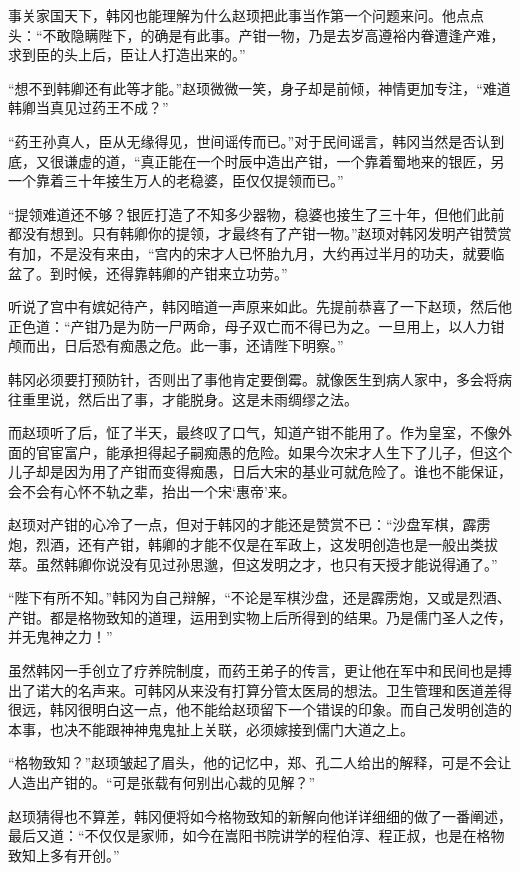 事关家国天下，韩冈也能理解为什么赵顼把此事当作第一个问题来问。他点点头：“不敢隐瞒陛下，的确是有此事。产钳一物，乃是去岁高遵裕内眷遭逢产难，求到臣的头上后，臣让人打造出来的。”

“想不到韩卿还有此等才能。”赵顼微微一笑，身子却是前倾，神情更加专注，“难道韩卿当真见过药王不成？”

“药王孙真人，臣从无缘得见，世间谣传而已。”对于民间谣言，韩冈当然是否认到底，又很谦虚的道，“真正能在一个时辰中造出产钳，一个靠着蜀地来的银匠，另一个靠着三十年接生万人的老稳婆，臣仅仅提领而已。”

“提领难道还不够？银匠打造了不知多少器物，稳婆也接生了三十年，但他们此前都没有想到。只有韩卿你的提领，才最终有了产钳一物。”赵顼对韩冈发明产钳赞赏有加，不是没有来由，“宫内的宋才人已怀胎九月，大约再过半月的功夫，就要临盆了。到时候，还得靠韩卿的产钳来立功劳。”

听说了宫中有嫔妃待产，韩冈暗道一声原来如此。先提前恭喜了一下赵顼，然后他正色道：“产钳乃是为防一尸两命，母子双亡而不得已为之。一旦用上，以人力钳颅而出，日后恐有痴愚之危。此一事，还请陛下明察。”

韩冈必须要打预防针，否则出了事他肯定要倒霉。就像医生到病人家中，多会将病往重里说，然后出了事，才能脱身。这是未雨绸缪之法。

而赵顼听了后，怔了半天，最终叹了口气，知道产钳不能用了。作为皇室，不像外面的官宦富户，能承担得起子嗣痴愚的危险。如果今次宋才人生下了儿子，但这个儿子却是因为用了产钳而变得痴愚，日后大宋的基业可就危险了。谁也不能保证，会不会有心怀不轨之辈，抬出一个宋‘惠帝’来。

赵顼对产钳的心冷了一点，但对于韩冈的才能还是赞赏不已：“沙盘军棋，霹雳炮，烈酒，还有产钳，韩卿的才能不仅是在军政上，这发明创造也是一般出类拔萃。虽然韩卿你说没有见过孙思邈，但这发明之才，也只有天授才能说得通了。”

“陛下有所不知。”韩冈为自己辩解，“不论是军棋沙盘，还是霹雳炮，又或是烈酒、产钳。都是格物致知的道理，运用到实物上后所得到的结果。乃是儒门圣人之传，并无鬼神之力！”

虽然韩冈一手创立了疗养院制度，而药王弟子的传言，更让他在军中和民间也是搏出了诺大的名声来。可韩冈从来没有打算分管太医局的想法。卫生管理和医道差得很远，韩冈很明白这一点，他不能给赵顼留下一个错误的印象。而自己发明创造的本事，也决不能跟神神鬼鬼扯上关联，必须嫁接到儒门大道之上。

“格物致知？”赵顼皱起了眉头，他的记忆中，郑、孔二人给出的解释，可是不会让人造出产钳的。“可是张载有何别出心裁的见解？”

赵顼猜得也不算差，韩冈便将如今格物致知的新解向他详详细细的做了一番阐述，最后又道：“不仅仅是家师，如今在嵩阳书院讲学的程伯淳、程正叔，也是在格物致知上多有开创。”

